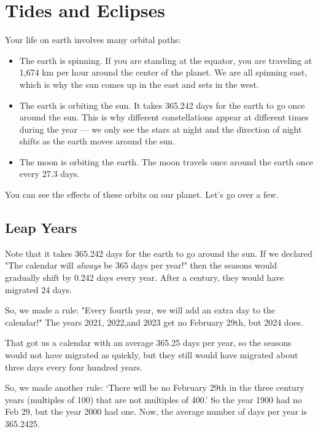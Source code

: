 \chapter{Tides and Eclipses}
Your life on earth involves many orbital paths:
\begin{itemize}

\item The earth is spinning.  If you are standing at the equator,  you are traveling at 1,674 km per hour around the center of the planet.  We are all spinning east,  which is why the sun comes up in the east and sets in the west.

\item  The earth is orbiting the sun. It takes 365.242 days for the earth to go once around the sun.  This is why different constellations appear at different times during the year --- we only see the stars at night and the direction of night shifts as the earth moves around the sun.  

\item The moon is orbiting the earth. The moon travels once around the earth once every 27.3 days.  

\end{itemize}

You can see the effects of these orbits on our planet. Let's go over a few.

\section{Leap Years}

Note that it takes 365.242 days for the earth to go around the sun.  If we declared "The calendar will \emph{always} be 365 days per year!"  then the seasons would gradually shift by 0.242 days every year.  After a century,  they would have migrated 24 days.

So, we made a rule: "Every fourth year,  we will add an extra day to the calendar!"  The years 2021, 2022,and 2023 get no February 29th, but 2024 does.

That got us a calendar with an average 365.25 days per year, so the seasons would not have migrated as quickly,  but they still would have migrated about three days every four hundred years.

So, we made another rule: `There will be no February 29th in the three century years (multiples of 100) that are not multiples of 400.' So the year 1900 had no Feb 29,  but the year 2000 had one. Now, the average number of days per year is 365.2425.


